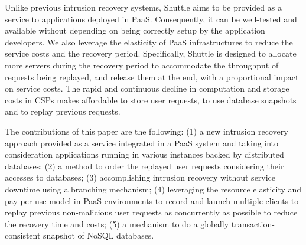 Unlike previous intrusion recovery systems, Shuttle aims to be provided as a service to applications deployed in \ac{PaaS}. Consequently, it can be well-tested and available without depending on being correctly setup by the application developers. We also leverage the elasticity of \ac{PaaS} infrastructures to reduce the service costs and the recovery period. Specifically, Shuttle is designed to allocate more servers during the recovery period to accommodate the throughput of requests being replayed, and release them at the end, with a proportional impact on service costs. The rapid and continuous decline in computation and storage costs in CSPs makes affordable to store user requests, to use database snapshots and to replay previous  requests.

The contributions of this paper are the following: 
(1) a new intrusion recovery approach provided as a service integrated in a \ac{PaaS} system and taking into consideration applications running in various instances backed by distributed databases;
(2) a method to order the replayed user requests considering their accesses to databases;
(3) accomplishing intrusion recovery without service downtime using a branching mechanism;
(4) leveraging the resource elasticity and pay-per-use model in \ac{PaaS} environments to record and launch multiple clients to replay previous non-malicious user requests as concurrently as possible to reduce the recovery time and costs;
(5) a mechanism to do a globally transaction-consistent snapshot of NoSQL databases.

